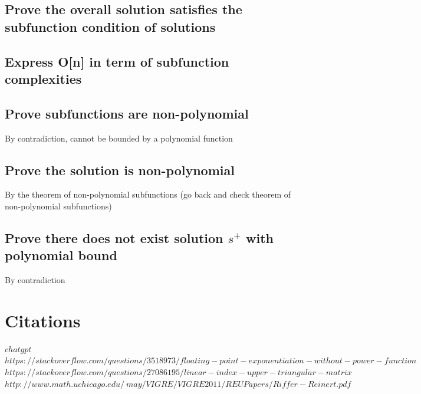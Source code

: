 \documentclass[11pt]{article}
\begin{document}
\subsection{Prove the overall solution satisfies the subfunction condition of solutions}
\subsection{Express O[n] in term of subfunction complexities}

\subsection{Prove subfunctions are non-polynomial}
By contradiction, cannot be bounded by a polynomial function

\subsection{Prove the solution is non-polynomial}
By the theorem of non-polynomial subfunctions (go back and check theorem of non-polynomial subfunctions)

\subsection{Prove there does not exist solution $s^+$ with polynomial bound}
By contradiction


\newpage
\section*{Citations}
\rbrack \hspace{1mm} $chatgpt$\\
\rbrack \hspace{1mm} $https://stackoverflow.com/questions/3518973/floating-point-exponentiation-without-power-function$\\
\rbrack \hspace{1mm} $https://stackoverflow.com/questions/27086195/linear-index-upper-triangular-matrix$\\
\rbrack \hspace{1mm} $http://www.math.uchicago.edu/~may/VIGRE/VIGRE2011/REUPapers/Riffer-Reinert.pdf$
\end{document}
